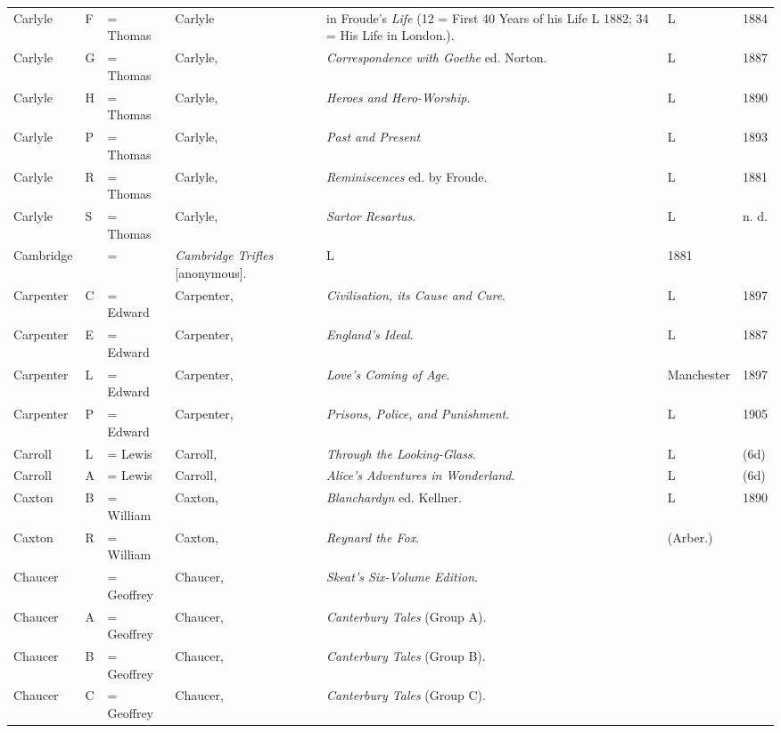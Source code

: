 \begin{sidewaystable}
\centering\small
\begin{tabular}{p{} p{} p{} p{} p{} p{} p{}}
Carlyle & F & = Thomas & Carlyle & in Froude's \textit{Life} (12 = First 40 Years of his Life L 1882; 34 = His Life in London.). &L & 1884 \\
Carlyle & G & = Thomas & Carlyle, & \textit{Correspondence with Goethe} ed. Norton. & L & 1887 \\
Carlyle & H & = Thomas & Carlyle, & \textit{Heroes and Hero-Worship}. & L & 1890 \\
Carlyle & P & = Thomas & Carlyle, & \textit{Past and Present} & L & 1893 \\
Carlyle & R & = Thomas & Carlyle, & \textit{Reminiscences} ed. by Froude. & L & 1881 \\
Carlyle & S & = Thomas & Carlyle, & \textit{Sartor Resartus}. & L & n. d. \\
Cambridge & & = & \textit{Cambridge Trifles} [anonymous]. & L & 1881 \\
Carpenter & C & = Edward & Carpenter, & \textit{Civilisation, its Cause and Cure}. & L & 1897 \\
Carpenter & E & = Edward & Carpenter, & \textit{England's Ideal}. & L & 1887 \\
Carpenter & L & = Edward & Carpenter, & \textit{Love's Coming of Age}. & Manchester & 1897 \\
Carpenter & P & = Edward & Carpenter, & \textit{Prisons, Police, and Punishment}. & L & 1905 \\
Carroll & L & = Lewis & Carroll, & \textit{Through the Looking-Glass}. & L & (6d) \\
Carroll & A & = Lewis & Carroll, & \textit{Alice's Adventures in Wonderland}. & L & (6d) \\Caxton & B & = William & Caxton, & \textit{Blanchardyn} ed. Kellner. & L & 1890 \\
Caxton & R & = William & Caxton, & \textit{Reynard the Fox}. & (Arber.) & \\
Chaucer & & = Geoffrey & Chaucer, & \textit{Skeat's Six-Volume Edition}. & & \\
Chaucer & A & = Geoffrey & Chaucer, & \textit{Canterbury Tales} (Group A). & & \\
Chaucer & B & = Geoffrey & Chaucer, & \textit{Canterbury Tales} (Group B). & & \\
Chaucer & C & = Geoffrey & Chaucer, & \textit{Canterbury Tales} (Group C). & & \\

\end{tabular}
\end{sidewaystable}
